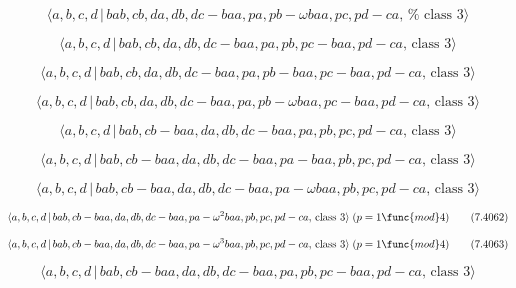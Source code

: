 \documentclass[10pt]{article}
\begin{document}
\begin{equation}
\langle a,b,c,d\,|\,bab,cb,da,db,dc-baa,pa,pb-\omega baa,pc,pd-ca,\,\text{%
class }3\rangle  \tag{7.4055}
\end{equation}

\begin{equation}
\langle a,b,c,d\,|\,bab,cb,da,db,dc-baa,pa,pb,pc-baa,pd-ca,\,\text{class }%
3\rangle  \tag{7.4056}
\end{equation}

\begin{equation}
\langle a,b,c,d\,|\,bab,cb,da,db,dc-baa,pa,pb-baa,pc-baa,pd-ca,\,\text{class 
}3\rangle  \tag{7.4057}
\end{equation}

\begin{equation}
\langle a,b,c,d\,|\,bab,cb,da,db,dc-baa,pa,pb-\omega baa,pc-baa,pd-ca,\,%
\text{class }3\rangle  \tag{7.4058}
\end{equation}

\begin{equation}
\langle a,b,c,d\,|\,bab,cb-baa,da,db,dc-baa,pa,pb,pc,pd-ca,\,\text{class }%
3\rangle  \tag{7.4059}
\end{equation}

\begin{equation}
\langle a,b,c,d\,|\,bab,cb-baa,da,db,dc-baa,pa-baa,pb,pc,pd-ca,\,\text{class 
}3\rangle  \tag{7.4060}
\end{equation}

\begin{equation}
\langle a,b,c,d\,|\,bab,cb-baa,da,db,dc-baa,pa-\omega baa,pb,pc,pd-ca,\,%
\text{class }3\rangle  \tag{7.4061}
\end{equation}

\begin{equation}
\langle a,b,c,d\,|\,bab,cb-baa,da,db,dc-baa,pa-\omega ^{2}baa,pb,pc,pd-ca,\,%
\text{class }3\rangle \;(p=1\func{mod}4)  \tag{7.4062}
\end{equation}

\begin{equation}
\langle a,b,c,d\,|\,bab,cb-baa,da,db,dc-baa,pa-\omega ^{3}baa,pb,pc,pd-ca,\,%
\text{class }3\rangle \;(p=1\func{mod}4)  \tag{7.4063}
\end{equation}

\begin{equation}
\langle a,b,c,d\,|\,bab,cb-baa,da,db,dc-baa,pa,pb,pc-baa,pd-ca,\,\text{class 
}3\rangle  \tag{7.4064}
\end{equation}
\end{document}
